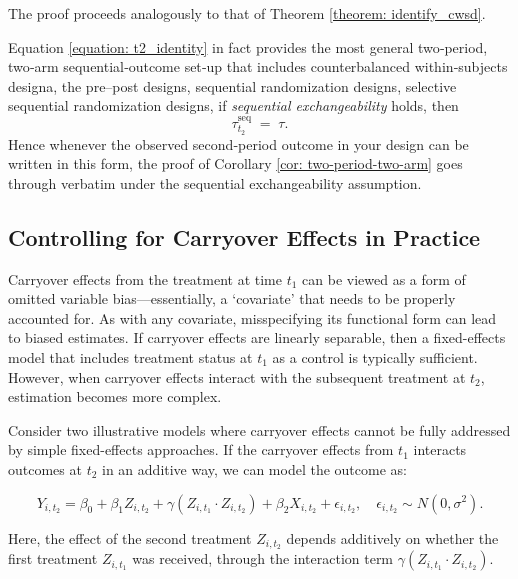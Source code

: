 The proof proceeds analogously to that of Theorem \ref{theorem: identify_cwsd}.

\begin{remark}
  Equation \ref{equation: t2_identity} in fact provides the most general two‐period, two‐arm sequential‐outcome set‐up that includes counterbalanced within‐subjects designa, the pre–post designs, sequential randomization designs,  selective sequential randomization designs, if \emph{sequential exchangeability}
  holds, then
  \[
    \tau_{t_2}^{\mathrm{seq}} \;=\; \tau.
  \] Hence whenever the observed second‐period outcome in your design can be written in this form, the proof of Corollary \ref{cor: two-period-two-arm} goes through verbatim under the sequential exchangeability assumption. 
\end{remark}

\subsection{Controlling for Carryover Effects in Practice}
\label{sec: control_carryover_eff_challenges}

Carryover effects from the treatment at time $t_1$ can be viewed as a form of omitted variable bias—essentially, a `covariate' that needs to be properly accounted for. As with any covariate, misspecifying its functional form can lead to biased estimates. If carryover effects are linearly separable, then a fixed-effects model that includes treatment status at $t_1$ as a control is typically sufficient. However, when carryover effects interact with the subsequent treatment at $t_2$, estimation becomes more complex.

Consider two illustrative models where carryover effects cannot be fully addressed by simple fixed-effects approaches. If the carryover effects from $t_1$ interacts outcomes at $t_2$ in an additive way, we can model the outcome as:

\begin{equation}
\label{eq: interaction_carryover}
Y_{i,t_2} 
= \beta_0 + \beta_1 Z_{i,t_2} 
+ \gamma (Z_{i,t_1} \cdot Z_{i,t_2}) 
+ \beta_2 X_{i, t_2} 
+ \epsilon_{i, t_2}, 
\quad \epsilon_{i, t_2} \sim N(0,\sigma^2).
\end{equation}

Here, the effect of the second treatment $Z_{i,t_2}$ depends additively on whether the first treatment $Z_{i,t_1}$ was received, through the interaction term $\gamma (Z_{i,t_1} \cdot Z_{i,t_2})$.

